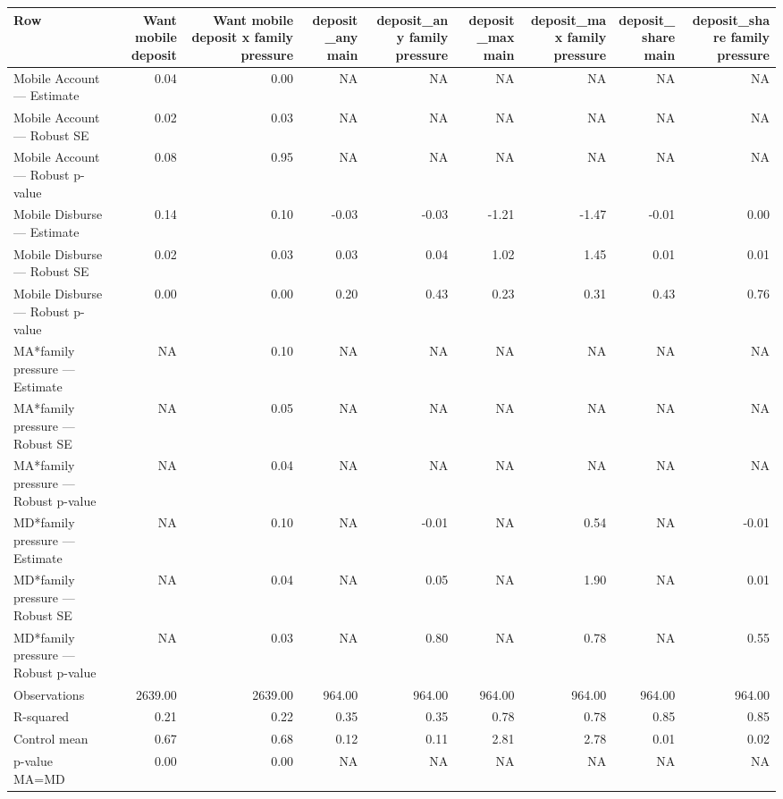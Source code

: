 
\begin{tabular}{lrrrrrrrr}
\toprule
Row & Want mobile deposit & Want mobile deposit x family pressure & deposit\_any main & deposit\_any family pressure & deposit\_max main & deposit\_max family pressure & deposit\_share main & deposit\_share family pressure\\
\midrule
Mobile Account — Estimate & 0.04 & 0.00 & NA & NA & NA & NA & NA & NA\\
Mobile Account — Robust SE & 0.02 & 0.03 & NA & NA & NA & NA & NA & NA\\
Mobile Account — Robust p-value & 0.08 & 0.95 & NA & NA & NA & NA & NA & NA\\
Mobile Disburse — Estimate & 0.14 & 0.10 & -0.03 & -0.03 & -1.21 & -1.47 & -0.01 & 0.00\\
Mobile Disburse — Robust SE & 0.02 & 0.03 & 0.03 & 0.04 & 1.02 & 1.45 & 0.01 & 0.01\\
\addlinespace
Mobile Disburse — Robust p-value & 0.00 & 0.00 & 0.20 & 0.43 & 0.23 & 0.31 & 0.43 & 0.76\\
MA*family pressure — Estimate & NA & 0.10 & NA & NA & NA & NA & NA & NA\\
MA*family pressure — Robust SE & NA & 0.05 & NA & NA & NA & NA & NA & NA\\
MA*family pressure — Robust p-value & NA & 0.04 & NA & NA & NA & NA & NA & NA\\
MD*family pressure — Estimate & NA & 0.10 & NA & -0.01 & NA & 0.54 & NA & -0.01\\
\addlinespace
MD*family pressure — Robust SE & NA & 0.04 & NA & 0.05 & NA & 1.90 & NA & 0.01\\
MD*family pressure — Robust p-value & NA & 0.03 & NA & 0.80 & NA & 0.78 & NA & 0.55\\
Observations & 2639.00 & 2639.00 & 964.00 & 964.00 & 964.00 & 964.00 & 964.00 & 964.00\\
R-squared & 0.21 & 0.22 & 0.35 & 0.35 & 0.78 & 0.78 & 0.85 & 0.85\\
Control mean & 0.67 & 0.68 & 0.12 & 0.11 & 2.81 & 2.78 & 0.01 & 0.02\\
\addlinespace
p-value MA=MD & 0.00 & 0.00 & NA & NA & NA & NA & NA & NA\\
\bottomrule
\end{tabular}
